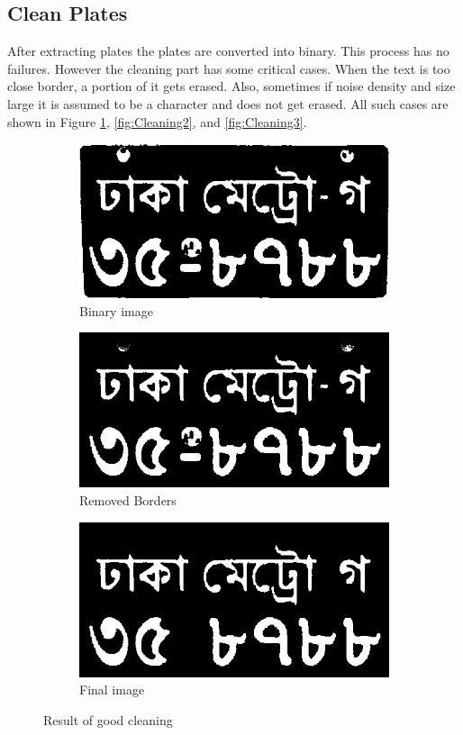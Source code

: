 \subsection{Clean Plates}
After extracting plates the plates are converted into binary. This process has no failures. However the cleaning part has some critical cases. When the text is too close border, a portion of it gets erased. Also, sometimes if noise density and size large it is assumed to be a character and does not get erased. All such cases are shown in Figure \ref{fig:Cleaning1}, \ref{fig:Cleaning2}, and \ref{fig:Cleaning3}.


\begin{figure}
\begin{subfigure}{0.33\textwidth}
    \centering
    \includegraphics[width=0.9\linewidth]{./img/experiment/stage.14/01-00-good}
    \caption{Binary image}
\end{subfigure}
\begin{subfigure}{0.33\textwidth}
    \centering
    \includegraphics[width=0.9\linewidth]{./img/experiment/stage.15/01-00-good}
    \caption{Removed Borders}
\end{subfigure}
\begin{subfigure}{0.33\textwidth}
    \centering
    \includegraphics[width=0.9\linewidth]{./img/experiment/stage.16/01-00-good}
    \caption{Final image}
\end{subfigure}
\caption{Result of good cleaning}
\label{fig:Cleaning1}
\end{figure}

